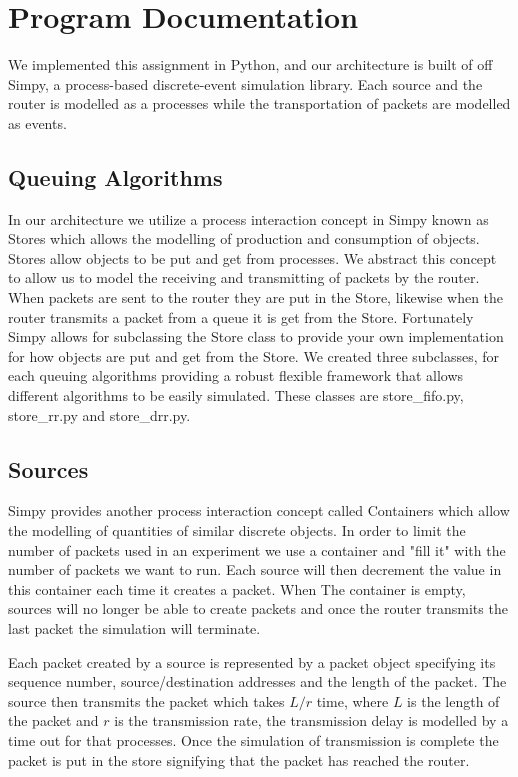 

\section{Program Documentation}

We implemented this assignment in Python, and our architecture is built of off Simpy, a process-based discrete-event simulation library. Each source and the router is modelled as a processes while the transportation of packets are modelled as events. 

\subsection{Queuing Algorithms}

In our architecture we utilize a process interaction concept in Simpy known as Stores which allows the modelling of production and consumption of objects. Stores allow objects to be put and get from processes. 
We abstract this concept to allow us to model the receiving and transmitting of packets by the router. 
When packets are sent to the router they are put in the Store, likewise when the router transmits a packet from a queue it is get from the Store.  
Fortunately Simpy allows for subclassing the Store class to provide your own implementation for how objects are put and get from the Store. 
We created three subclasses, for each queuing algorithms providing a robust flexible framework that allows different algorithms to be easily simulated. These classes are store\_fifo.py, store\_rr.py and store\_drr.py.

\subsection{Sources}

Simpy provides another process interaction concept called Containers which allow the modelling of quantities of similar discrete objects. In order to limit the number of packets used in an experiment we use a container and "fill it" with the number of packets we want to run. Each source will then decrement the value in this container each time it creates a packet. When The container is empty, sources will no longer be able to create packets and once the router transmits the last packet the simulation will terminate.

Each packet created by a source is represented by a packet object specifying its sequence number, source/destination addresses and the length of the packet. The source then transmits the packet which takes $L/r$ time, where $L$ is the length of the packet and $r$ is the transmission rate, the transmission delay is modelled by a time out for that processes. Once the simulation of transmission is complete the packet is put in the store signifying that the packet has reached the router.

